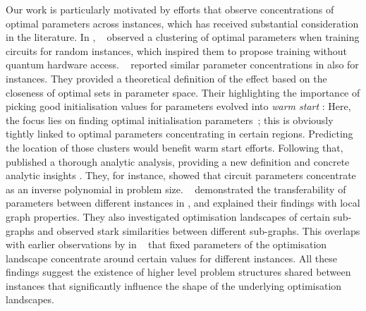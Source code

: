 Our work is particularly motivated by efforts that observe concentrations of optimal \QAOA parameters across instances, which has received substantial consideration in the literature. In \citeyear{streif2020training}, \citeauthor{streif2020training}~\cite{streif2020training} observed a clustering of optimal parameters when training \QAOA circuits for random \maxcut instances, which inspired them to propose
training \QAOA without quantum hardware access. \citeauthor{sack2021quantum}~\cite{sack2021quantum} reported similar parameter concentrations in \citeyear{sack2021quantum} also for \maxcut instances. They provided a theoretical definition of the effect based on the closeness of optimal sets in parameter space. Their highlighting the importance of picking good initialisation values for \QAOA parameters evolved into \emph{warm start \QAOA}: Here, the focus lies on finding optimal initialisation parameters~\cite{Egger:2021}; this is obviously tightly linked to optimal parameters concentrating in certain regions. Predicting the location of those clusters would benefit warm start efforts. Following that, \citeauthor{akshay2021parameter} published a thorough analytic analysis, providing a new definition and concrete analytic insights \cite{akshay2021parameter}. They, for instance, showed that \QAOA circuit parameters concentrate as an inverse polynomial in problem size. \citeauthor{galda2similarity}~\cite{galda2similarity} demonstrated the transferability of \QAOA parameters between different \maxcut instances in \citeyear{galda2similarity}, and explained their findings with local graph properties. They also investigated optimisation landscapes of certain sub-graphs and observed stark similarities between different sub-graphs. This overlaps with earlier observations by \citeauthor{brandao2018fixed} in  \citeyear{brandao2018fixed}~\cite{brandao2018fixed} that fixed parameters of the optimisation landscape concentrate around certain values for different instances. All these findings suggest the existence of higher level problem structures shared between instances that significantly influence the shape of the underlying optimisation landscapes. 

